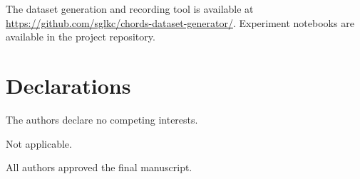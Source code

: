 \documentclass[pdflatex,sn-mathphys-num,iicol]{sn-jnl}
\theoremstyle{thmstyleone}
\theoremstyle{thmstyletwo}
\theoremstyle{thmstylethree}
\begin{document}
The dataset generation and recording tool is available at \url{https://github.com/sglkc/chords-dataset-generator/}. Experiment notebooks are available in the project repository.

\section*{Declarations}

The authors declare no competing interests.

Not applicable.

All authors approved the final manuscript.


\end{document}
